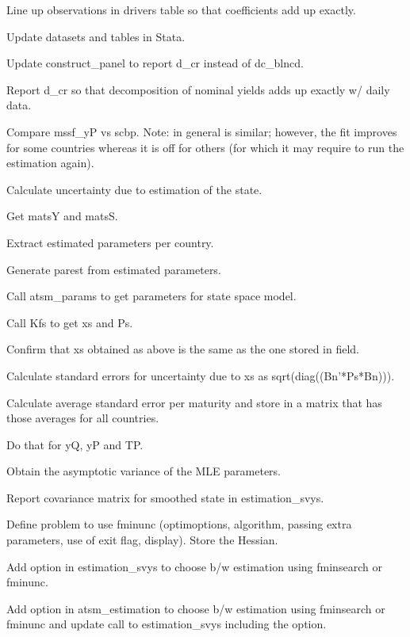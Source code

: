 \documentclass[12pt]{article}
\newcommand{\cmark}{\ding{51}}
\newcommand{\done}{\rlap{$\square$}{\raisebox{2pt}{\large\hspace{1pt}\cmark}}%
	\hspace{-2.5pt}}
\begin{document}
\begin{todolist}
\begin{todolist}
	\end{todolist}
	\item[\done] Line up observations in drivers table so that coefficients add up exactly.
	\item[\done] Update datasets and tables in Stata.
	\item[\done] Update construct_panel to report d_cr instead of dc_blncd.
	\item[\done] Report d_cr so that decomposition of nominal yields adds up exactly w/ daily data.
	\item[\done] Compare mssf_yP vs scbp. Note: in general is similar; however, the fit improves for some countries whereas it is off for others (for which it may require to run the estimation again).
	\item[\done] Calculate uncertainty due to estimation of the state.
	\begin{todolist}
		\item[\done] Get matsY and matsS.
		\item[\done] Extract estimated parameters per country.
		\item[\done] Generate parest from estimated parameters.
		\item[\done] Call atsm_params to get parameters for state space model.
		\item[\done] Call Kfs to get xs and Ps.
		\item[\done] Confirm that xs obtained as above is the same as the one stored in field.
		\item[\done] Calculate standard errors for uncertainty due to xs as sqrt(diag((Bn'*Ps*Bn))).
		\item[\done] Calculate average standard error per maturity and store in a matrix that has those averages for all countries.
		\item[\done] Do that for yQ, yP and TP.
	\end{todolist}
	\item[\done] Obtain the asymptotic variance of the MLE parameters.
	\begin{todolist}
		\item[\done] Report covariance matrix for smoothed state in estimation_svys.
		\item[\done] Define problem to use fminunc (optimoptions, algorithm, passing extra parameters, use of exit flag, display). Store the Hessian.
		\item[\done] Add option in estimation_svys to choose b/w estimation using fminsearch or fminunc.
		\item[\done] Add option in atsm_estimation to choose b/w estimation using fminsearch or fminunc and update call to estimation_svys including the option.

\end{todolist}
\end{todolist}
\end{document}
